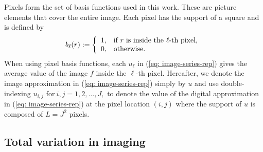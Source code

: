 \documentclass[smallextended]{svjour3}      %
\begin{document}
Pixels form the set of basis functions used in this work. These are picture elements that cover the entire image. Each pixel has the support of a square and is defined by
\begin{equation}
b_{\ell}(r):=\left\{ \begin{array}{cl}
1, & \mbox{if \ensuremath{r} is inside the \ensuremath{\ell}-th pixel},\\
0, & \mbox{otherwise.}
\end{array}\right.
\end{equation}
When using pixel basis functions, each $u_{\ell}$ in (\ref{eq: image-series-rep}) gives the average value of the image $f$ inside the $\ell$-th pixel. Hereafter, we denote the image approximation in (\ref{eq: image-series-rep}) simply by $u$ and use double-indexing $u_{i,j}$ for$\:i,j=1,2,\ldots,J,$ to denote the value of the digital approximation in (\ref{eq: image-series-rep}) at the pixel location $(i,j)$ where the support of $u$ is composed of $L=J^{2}$ pixels.

\subsection{Total variation in imaging\label{subsec:TV}}
\end{document}
